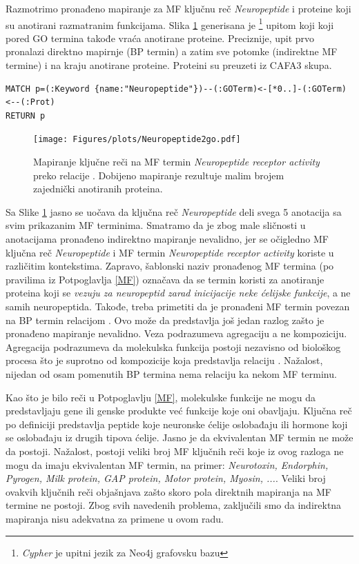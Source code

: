 Razmotrimo pronađeno mapiranje za MF ključnu reč \textit{Neuropeptide} i
proteine koji su anotirani razmatranim funkcijama. Slika \ref{fig:neuropeptide}
generisana je \footnote{\textit{Cypher} je upitni jezik za
Neo4j grafovsku bazu} upitom koji koji pored GO termina takođe vraća anotirane
proteine. Preciznije, upit prvo pronalazi direktno mapirnje (BP termin)  a
zatim sve potomke (indirektne MF termine) i na kraju anotirane proteine.
Proteini su preuzeti iz CAFA3 skupa. 

{ \small
\begin{verbatim}
MATCH p=(:Keyword {name:"Neuropeptide"})--(:GOTerm)<-[*0..]-(:GOTerm)<--(:Prot)
RETURN p
\end{verbatim}
}

\begin{figure}[!th]
\centering
\hspace*{-1.0cm} 
\texttt{[image: Figures/plots/Neuropeptide2go.pdf]}
\decoRule
\caption {
  Mapiranje ključne reči  na MF termin
  \textit{Neuropeptide receptor activity} preko relacije .
  Dobijeno mapiranje rezultuje malim brojem zajednički anotiranih proteina.
}
\label{fig:neuropeptide}
\end{figure}

Sa Slike \ref{fig:neuropeptide} jasno se uočava da ključna reč
\textit{Neuropeptide} deli svega 5 anotacija sa svim prikazanim MF terminima.
Smatramo da je zbog male sličnosti u anotacijama pronađeno indirektno
mapiranje nevalidno, jer se očigledno MF ključna reč \textit{Neuropeptide} i
MF termin \textit{Neuropeptide receptor activity} koriste u različitim
kontekstima. Zapravo, šablonski naziv pronađenog MF termina (po pravilima iz
Potpoglavlja \ref{MF}) označava da se termin koristi za anotiranje proteina
koji se \textit{vezuju za neuropeptid zarad inicijacije neke ćelijske
funkcije}, a ne samih neuropeptida. Takođe, treba primetiti da je pronađeni MF
termin povezan na BP termin relacijom .  Ovo može da
predstavlja još jedan razlog zašto je pronađeno mapiranje nevalidno.  Veza
 podrazumeva agregaciju a ne kompoziciju. Agregacija
podrazumeva da  molekulska funkcija postoji nezavisno od biološkog procesa što
je suprotno od kompozicije koja predstavlja relaciju . Nažalost,
nijedan od osam pomenutih BP termina nema relaciju  ka nekom MF
terminu.

\clearpage

Kao što je bilo reči u Potpoglavlju \ref{MF}, molekulske funkcije ne mogu da
predstavljaju gene ili genske produkte već funkcije koje oni obavljaju. Ključna
reč  po definiciji predstavlja peptide koje neuronske
ćelije oslobađaju ili hormone koji se oslobađaju iz drugih tipova ćelije. Jasno
je da ekvivalentan MF termin ne može da postoji.  Nažalost, postoji veliki broj
MF ključnih reči koje iz ovog razloga ne mogu da imaju ekvivalentan MF termin,
na primer: \textit{ Neurotoxin, Endorphin, Pyrogen, Milk protein, GAP protein,
Motor protein, Myosin, ...}. Veliki broj ovakvih ključnih reči objašnjava 
zašto skoro pola direktnih mapiranja na MF termine ne postoji.  Zbog svih
navedenih problema, zaključili smo da indirektna mapiranja nisu adekvatna za
primene u ovom radu.

